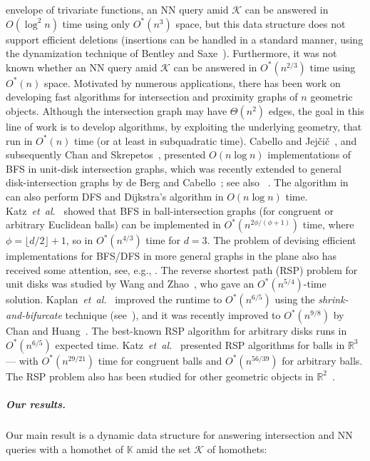 \documentclass[11pt]{article}
\newif\ifsocgproc
\def\reals{{\mathbb R}}
\def\Kspace{{\mathbb K}}
\def\K{\mathcal{K}}
\def\etal{\textsl{et~al.}}
\theoremstyle{definition}
\begin{document}
envelope of trivariate functions, an NN query amid $\K$ can be answered in $O(\log^2 n)$ time 
using only $O^*(n^3)$ space, but this data structure does not support efficient deletions 
(insertions can be handled in a standard manner, using the dynamization technique 
of Bentley and Saxe~\cite{BS80}). Furthermore, it was not known whether an NN query 
amid $\K$ can be answered in $O^*(n^{2/3})$ time using $O^*(n)$ space.
%
Motivated by numerous applications, there has been work on developing fast algorithms 
for intersection and proximity graphs of $n$ geometric objects. Although the intersection 
graph may have $\Theta(n^2)$ edges, the goal in this line of work is to develop algorithms, 
by exploiting the underlying geometry, that run in $O^*(n)$ time (or at least in subquadratic time).
Cabello and Jej\v{c}i\v{c}~\cite{CabelloJ15}, and subsequently Chan and Skrepetos~\cite{CS}, presented
$O(n \log n)$ implementations of BFS in unit-disk intersection graphs, which was recently 
extended to general disk-intersection graphs by de Berg and Cabello~\cite{BergC25}; 
see also ~\cite{KKSS,KMRSS,Klost23}. The algorithm in~\cite{BergC25} can also perform DFS 
and Dijkstra's algorithm in $O(n\log n)$ time.
Katz~\etal~\cite{KSS} showed that BFS in ball-intersection graphs (for congruent or 
arbitrary Euclidean balls)
can be implemented in $O^*(n^{2\phi/(\phi+1)})$ time, where $\phi = \lfloor d/2 \rfloor + 1$, 
so in $O^*(n^{4/3})$ time for $d=3$. The problem of devising efficient implementations for BFS/DFS 
in more general graphs in the plane also has received some attention, 
see, e.g., \cite{AgarwalKKS24,AgarwalKS24,KSS24}.  
%
The reverse shortest path (RSP) problem for unit disks was studied by 
Wang and Zhao~\cite{WZ}, who gave an $O^*(n^{5/4})$-time solution. 
Kaplan~\etal~\cite{KKSS} improved the runtime to $O^*(n^{6/5})$ using the 
\emph{shrink-and-bifurcate} technique (see~\cite{BFKKS}), and it was recently improved to $O^*(n^{9/8})$ by
Chan and Huang~\cite{CH}. The best-known RSP algorithm for arbitrary disks runs in $O^*(n^{6/5})$ expected time.
Katz~\etal~\cite{KSS} presented RSP algorithms for balls in $\reals^3$ --- with 
$O^*(n^{29/21})$ time for congruent balls and $O^*(n^{56/39})$ for arbitrary balls.  
The RSP problem also has been studied for other geometric objects in 
$\reals^2$~\cite{AgarwalKS24,KSS,CH}.  
%
\ifsocgproc 
\subparagraph*{Our results.} 
Our main result is a dynamic data structure for answering intersection 
and NN queries with a homothet of $\Kspace$ amid the set $\K$ of homothets:
\else
\end{document}
